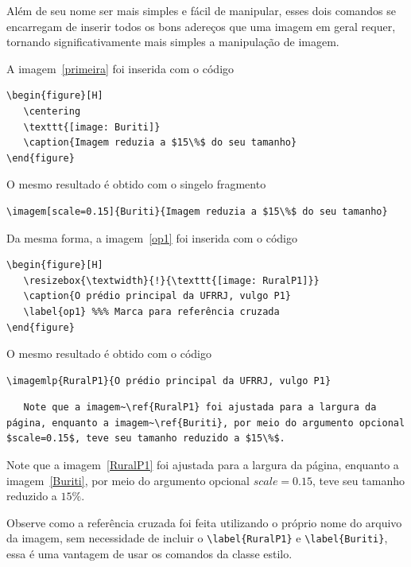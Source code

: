 Além de seu nome ser mais simples e fácil de manipular, esses dois comandos se encarregam de inserir todos os bons adereços que uma imagem em geral requer, tornando significativamente mais simples a manipulação de imagem.

A imagem~\ref{primeira} foi inserida com o código
\begin{tcolorbox}
\begin{lstlisting}
\begin{figure}[H]
   \centering
   \texttt{[image: Buriti]}
   \caption{Imagem reduzia a $15\%$ do seu tamanho}
\end{figure}
\end{lstlisting}
\end{tcolorbox}

O mesmo resultado é obtido com o singelo fragmento
\begin{tcolorbox}
\begin{lstlisting}
\imagem[scale=0.15]{Buriti}{Imagem reduzia a $15\%$ do seu tamanho}
\end{lstlisting}
\end{tcolorbox}

Da mesma forma, a imagem~\ref{op1} foi inserida com o código
\begin{tcolorbox}
\begin{lstlisting}
\begin{figure}[H]
   \resizebox{\textwidth}{!}{\texttt{[image: RuralP1]}}
   \caption{O prédio principal da UFRRJ, vulgo P1}
   \label{op1} %%% Marca para referência cruzada
\end{figure}
\end{lstlisting}
\end{tcolorbox}

O mesmo resultado é obtido com o código
\begin{tcolorbox}
\begin{lstlisting}
\imagemlp{RuralP1}{O prédio principal da UFRRJ, vulgo P1}
\end{lstlisting}
\end{tcolorbox}


\begin{tcolorbox}
\begin{lstlisting}
   Note que a imagem~\ref{RuralP1} foi ajustada para a largura da página, enquanto a imagem~\ref{Buriti}, por meio do argumento opcional $scale=0.15$, teve seu tamanho reduzido a $15\%$.
\end{lstlisting}
\tcblower
Note que a imagem~\ref{RuralP1} foi ajustada para a largura da página, enquanto a imagem~\ref{Buriti}, por meio do argumento opcional $scale=0.15$, teve seu tamanho reduzido a $15\%$.
\end{tcolorbox}

Observe como a referência cruzada foi feita utilizando o próprio nome do arquivo da imagem, sem necessidade de incluir o \verb|\label{RuralP1}| e \verb|\label{Buriti}|, essa é uma vantagem de usar os comandos da classe estilo.


